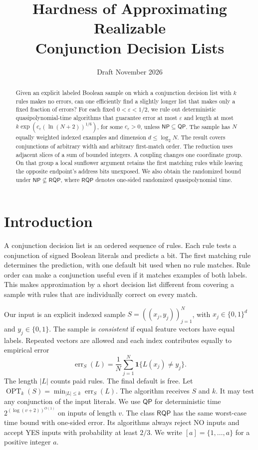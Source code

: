 \documentclass[11pt]{article}
\title{Hardness of Approximating Realizable\\Conjunction Decision Lists}
\author{}
\date{Draft \enspace\textbullet\enspace November 2026}
\newcommand{\err}{\operatorname{err}}
\newcommand{\OPT}{\operatorname{OPT}}
\newcommand{\QP}{\mathsf{QP}}
\newcommand{\RQP}{\mathsf{RQP}}
\newcommand{\NP}{\mathsf{NP}}
\begin{document}
\maketitle

\begin{abstract}
Given an explicit labeled Boolean sample on which a conjunction decision list with
$k$ rules makes no errors, can one efficiently find a slightly longer list that
makes only a fixed fraction of errors? For each fixed $0<\varepsilon<1/2$,
we rule out deterministic quasipolynomial-time algorithms that guarantee error at
most $\varepsilon$ and length at most
$k\exp(c_\varepsilon(\ln(N+2))^{1/6})$, for some $c_\varepsilon>0$, unless
$\NP\subseteq\QP$. The sample has $N$ equally weighted indexed examples and
dimension $d\le\log_2 N$. The result covers conjunctions of arbitrary width and
arbitrary first-match order. The reduction uses adjacent slices of a sum of
bounded integers. A coupling changes one coordinate group. On that group a local
sunflower argument retains the first matching rules while leaving the opposite
endpoint's address bits unexposed. We also obtain the randomized bound under
$\NP\nsubseteq\RQP$, where $\RQP$ denotes one-sided randomized quasipolynomial time.
\end{abstract}

\section{Introduction}

A conjunction decision list \cite{Rivest} is an ordered sequence of rules. Each rule tests a
conjunction of signed Boolean literals and predicts a bit. The first matching
rule determines the prediction, with one default bit used when no rule matches.
Rule order can make a conjunction useful even if it matches examples of both
labels. This makes approximation by a short decision list different from covering
a sample with rules that are individually correct on every match.

Our input is an explicit indexed sample $S=((x_j,y_j))_{j=1}^N$, with
$x_j\in\{0,1\}^d$ and $y_j\in\{0,1\}$. The sample is \emph{consistent} if equal
feature vectors have equal labels. Repeated vectors are allowed and each index
contributes equally to empirical error
\[
  \err_S(L)=\frac{1}{N}\sum_{j=1}^{N}\mathbf 1\{L(x_j)\ne y_j\}.
\]
The length $|L|$ counts paid rules. The final default is free.
Let $\OPT_k(S)=\min_{|L|\le k}\err_S(L)$. The algorithm receives $S$ and $k$.
It may test any conjunction of the input literals. We use $\QP$ for
deterministic time $2^{(\log(v+2))^{O(1)}}$ on inputs of length $v$. The class
$\RQP$ has the same worst-case time bound with one-sided error. Its algorithms
always reject NO inputs and accept YES inputs with probability at least $2/3$.
We write $[a]=\{1,\ldots,a\}$ for a positive integer $a$.
\end{document}
